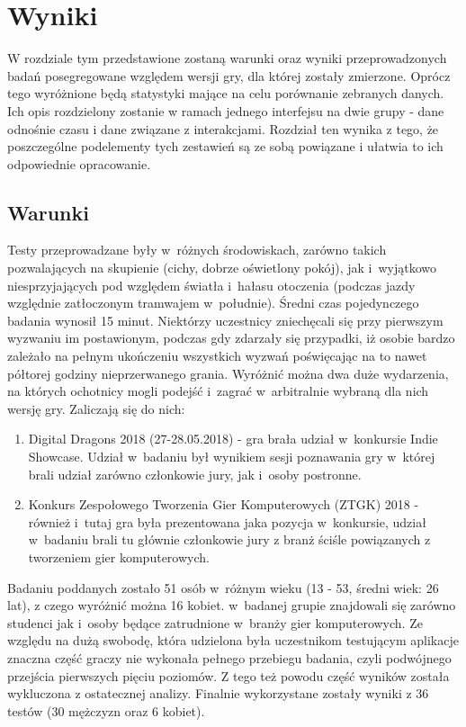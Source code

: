 \documentclass[a4paper,12pt,numbers=noenddot]{report}
\begin{document}
\chapter{Wyniki}
W rozdziale tym przedstawione zostaną warunki oraz wyniki przeprowadzonych badań posegregowane względem wersji gry, dla której zostały zmierzone. Oprócz tego wyróżnione będą statystyki mające na celu porównanie zebranych danych. Ich opis rozdzielony zostanie w ramach jednego interfejsu na dwie grupy - dane odnośnie czasu i dane związane z interakcjami. Rozdział ten wynika z tego, że poszczególne podelementy tych zestawień są ze sobą powiązane i ułatwia to ich odpowiednie opracowanie.

\section{Warunki}
Testy przeprowadzane były w~różnych środowiskach, zarówno takich pozwalających na skupienie (cichy, dobrze oświetlony pokój), jak i~wyjątkowo niesprzyjających pod względem światła i~hałasu otoczenia (podczas jazdy względnie zatłoczonym tramwajem w~południe). Średni czas pojedynczego badania wynosił 15 minut. Niektórzy uczestnicy zniechęcali się przy pierwszym wyzwaniu im postawionym, podczas gdy zdarzały się przypadki, iż osobie bardzo zależało na pełnym ukończeniu wszystkich wyzwań poświęcając na to nawet półtorej godziny nieprzerwanego grania. Wyróżnić można dwa duże wydarzenia, na których ochotnicy mogli podejść i~zagrać w~arbitralnie wybraną dla nich wersję gry. Zaliczają się do nich:
\begin{enumerate}
\item Digital Dragons 2018 (27-28.05.2018) - gra brała udział w~konkursie Indie Showcase. Udział w~badaniu był wynikiem sesji poznawania gry w~której brali udział zarówno członkowie jury, jak i~osoby postronne.
\item Konkurs Zespołowego Tworzenia Gier Komputerowych (ZTGK) 2018 - również i~tutaj gra była prezentowana jaka pozycja w~konkursie, udział w~badaniu brali tu głównie członkowie jury z branż ściśle powiązanych z tworzeniem gier komputerowych.
\end{enumerate}
Badaniu poddanych zostało 51 osób w~różnym wieku (13 - 53, średni wiek: 26 lat), z czego wyróżnić można 16 kobiet. w~badanej grupie znajdowali się zarówno studenci jak i~osoby będące zatrudnione w~branży gier komputerowych. Ze względu na dużą swobodę, która udzielona była uczestnikom testującym aplikacje znaczna część graczy nie wykonała pełnego przebiegu badania, czyli podwójnego przejścia pierwszych pięciu poziomów. Z tego też powodu część wyników została wykluczona z ostatecznej analizy. Finalnie wykorzystane zostały wyniki z 36 testów (30 mężczyzn oraz 6 kobiet).
\end{document}
